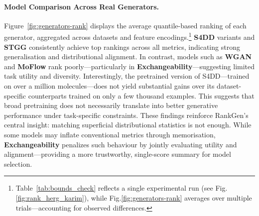 \paragraph{Model Comparison Across Real Generators.}
Figure~\ref{fig:generators-rank} displays the average quantile-based ranking of each generator, aggregated across datasets and feature encodings.\footnote{Table~\ref{tab:bounds_check} reflects a single experimental run (see Fig.\ref{fig:rank_herg_karim}), while Fig.\ref{fig:generators-rank} averages over multiple trials—accounting for observed differences.} \textbf{S4DD} variants and \textbf{STGG} consistently achieve top rankings across all metrics, indicating strong generalisation and distributional alignment. In contrast, models such as \textbf{WGAN} and \textbf{MoFlow} rank poorly—particularly in \textbf{Exchangeability}—suggesting limited task utility and diversity.
Interestingly, the pretrained version of S4DD—trained on over a million molecules—does not yield substantial gains over its dataset-specific counterparts trained on only a few thousand examples. This suggests that broad pretraining does not necessarily translate into better generative performance under task-specific constraints.
These findings reinforce RankGen’s central insight: matching superficial distributional statistics is not enough. While some models may inflate conventional metrics through memorisation, \textbf{Exchangeability} penalizes such behaviour by jointly evaluating utility and alignment—providing a more trustworthy, single-score summary for model selection.


